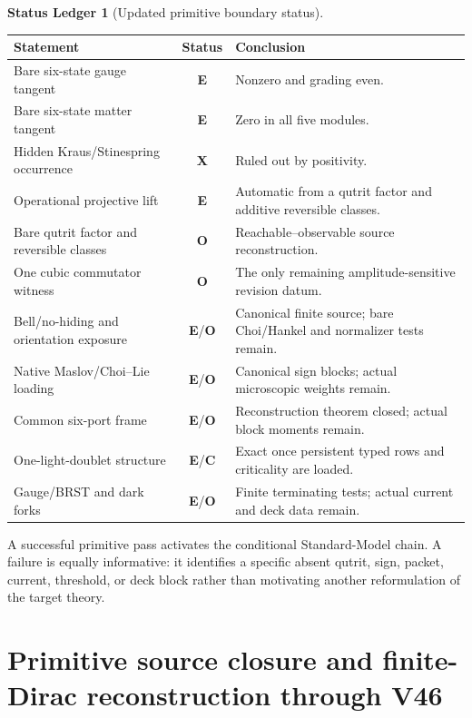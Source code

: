 \documentclass[11pt,oneside,openany]{book}
\numberwithin{equation}{chapter}
\theoremstyle{definition}
\newtheorem{ledger}[theorem]{Status Ledger}
\theoremstyle{remark}
\newcommand{\statusE}{\textcolor{ExactColor}{\textbf{E}}}
\newcommand{\statusC}{\textcolor{CondColor}{\textbf{C}}}
\newcommand{\statusO}{\textcolor{OpenColor}{\textbf{O}}}
\newcommand{\statusX}{\textcolor{SuperColor}{\textbf{X}}}
\begin{document}
\begin{ledger}[Updated primitive boundary status]
\begin{center}
\begin{tabularx}{0.97\textwidth}{@{}p{}cX@{}}
\toprule
Statement & Status & Conclusion\\
\midrule
Bare six-state gauge tangent
& \statusE
& Nonzero and grading even.\\
Bare six-state matter tangent
& \statusE
& Zero in all five modules.\\
Hidden Kraus/Stinespring occurrence
& \statusX
& Ruled out by positivity.\\
Operational projective lift
& \statusE
& Automatic from a qutrit factor and additive reversible classes.\\
Bare qutrit factor and reversible classes
& \statusO
& Reachable--observable source reconstruction.\\
One cubic commutator witness
& \statusO
& The only remaining amplitude-sensitive revision datum.\\
Bell/no-hiding and orientation exposure
& \statusE/\statusO
& Canonical finite source; bare Choi/Hankel and normalizer tests remain.\\
Native Maslov/Choi--Lie loading
& \statusE/\statusO
& Canonical sign blocks; actual microscopic weights remain.\\
Common six-port frame
& \statusE/\statusO
& Reconstruction theorem closed; actual block moments remain.\\
One-light-doublet structure
& \statusE/\statusC
& Exact once persistent typed rows and criticality are loaded.\\
Gauge/BRST and dark forks
& \statusE/\statusO
& Finite terminating tests; actual current and deck data remain.\\
\bottomrule
\end{tabularx}
\end{center}
\end{ledger}

A successful primitive pass activates the conditional Standard-Model chain.
A failure is equally informative: it identifies a specific absent qutrit,
sign, packet, current, threshold, or deck block rather than motivating another
reformulation of the target theory.

\part{Primitive source closure and finite-Dirac reconstruction through V46}
\label{part:v6-source-closure}
\end{document}
